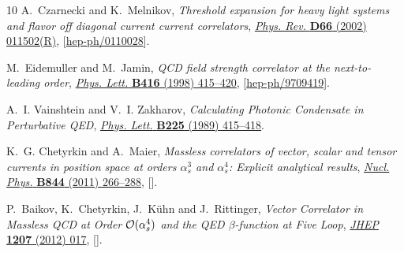 \documentclass[12pt]{article}
\numberwithin{equation}{section}
\newcommand{\1}[1]{\mathbf{1}^{#1}}
\newcommand{\2}[1]{\mathbf{2}^{#1}}
\newcommand{\3}[1]{\mathbf{3}^{#1}}
\newcommand{\4}[1]{\mathbf{4}^{#1}}
\newcommand{\5}[1]{\mathbf{5}^{#1}}
\begin{document}
\begin{thebibliography}{10}
A.~Czarnecki and K.~Melnikov, \emph{{Threshold expansion for heavy light
  systems and flavor off diagonal current current correlators}},
  \href{http://dx.doi.org/10.1103/PhysRevD.66.011502}{\emph{Phys. Rev.}
  {\bfseries D66} (2002) 011502(R)},
  [\href{https://arxiv.org/abs/hep-ph/0110028}{{\ttfamily hep-ph/0110028}}].

M.~Eidemuller and M.~Jamin, \emph{{QCD field strength correlator at the
  next-to-leading order}},
  \href{http://dx.doi.org/10.1016/S0370-2693(97)01352-X}{\emph{Phys. Lett.}
  {\bfseries B416} (1998) 415--420},
  [\href{https://arxiv.org/abs/hep-ph/9709419}{{\ttfamily hep-ph/9709419}}].

A.~I. Vainshtein and V.~I. Zakharov, \emph{{Calculating Photonic Condensate in
  Perturbative {QED}}},
  \href{http://dx.doi.org/10.1016/0370-2693(89)90593-5}{\emph{Phys. Lett.}
  {\bfseries B225} (1989) 415--418}.

K.~G. Chetyrkin and A.~Maier, \emph{{Massless correlators of vector, scalar and
  tensor currents in position space at orders $\alpha_s^3$ and $\alpha_s^4$:
  Explicit analytical results}},
  \href{http://dx.doi.org/10.1016/j.nuclphysb.2010.11.007}{\emph{Nucl. Phys.}
  {\bfseries B844} (2011) 266--288},
  [\href{https://arxiv.org/abs/1010.1145}{{}}].

P.~Baikov, K.~Chetyrkin, J.~K{\"u}hn and J.~Rittinger, \emph{{Vector Correlator
  in Massless QCD at Order ${\cal O}(\alpha_s^4)$ and the QED $\beta$-function
  at Five Loop}}, \href{http://dx.doi.org/10.1007/JHEP07(2012)017}{\emph{JHEP}
  {\bfseries 1207} (2012) 017},
  [\href{https://arxiv.org/abs/1206.1284}{{}}].

\end{thebibliography}\endgroup
\end{document}
